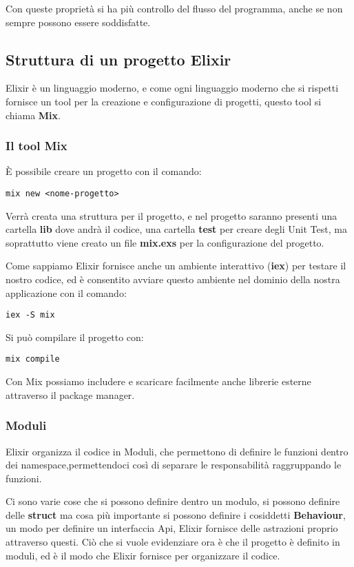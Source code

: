 Con queste proprietà si ha più controllo del flusso del programma,
anche se non sempre possono essere soddisfatte.


\subsection{Struttura di un progetto Elixir}

Elixir è un linguaggio moderno, e come ogni linguaggio moderno che
si rispetti fornisce un tool per la creazione e configurazione di
progetti, questo tool si chiama \textbf{Mix}.

\subsubsection{Il tool Mix}
È possibile creare un progetto con il comando:

\begin{lstlisting}[language=none]
mix new <nome-progetto>
\end{lstlisting}

Verrà creata una struttura per il progetto, e nel progetto saranno
presenti una cartella \textbf{lib} dove andrà il codice,
una cartella \textbf{test} per creare degli Unit Test, ma soprattutto
viene creato un file \textbf{mix.exs} per la configurazione del progetto.

Come sappiamo Elixir fornisce anche un ambiente interattivo (\textbf{iex}) per
testare il nostro codice, ed è consentito avviare questo ambiente nel
dominio della nostra applicazione con il comando:

\begin{lstlisting}[language=none]
iex -S mix 
\end{lstlisting}
Si può compilare il progetto con:
\begin{lstlisting}[language=none]
mix compile
\end{lstlisting}

Con Mix possiamo includere e scaricare facilmente anche librerie esterne attraverso
il package manager.\cite{HexDocs99:online}

\subsubsection{Moduli}
Elixir organizza il codice in Moduli, che permettono di definire
le funzioni dentro dei namespace,permettendoci così di separare
le responsabilità raggruppando le funzioni.

Ci sono varie cose che si possono definire dentro un modulo,
si possono definire delle \textbf{struct}
ma cosa più importante si possono definire i cosiddetti 
\textbf{Behaviour}, un modo per definire un interfaccia Api,
Elixir fornisce delle astrazioni proprio attraverso questi.
Ciò che si vuole evidenziare ora è che il progetto è definito
in moduli, ed è il modo che Elixir fornisce per organizzare il
codice.

